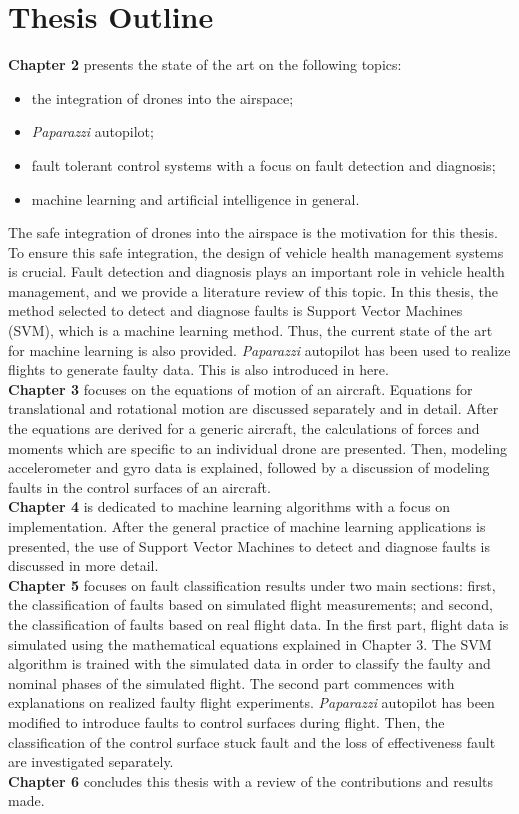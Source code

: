\section{Thesis Outline}

\textbf{Chapter 2} presents the state of the art on the following topics: 
\begin{itemize}
\item{the integration of drones into the airspace;}
\item{\emph{Paparazzi} autopilot;}
\item{fault tolerant control systems with a focus on fault detection and diagnosis;}
\item{machine learning and artificial intelligence in general.}
\end{itemize}
The safe integration of drones into the airspace is the motivation for this thesis. To ensure this safe integration, the design of vehicle health management systems is crucial. Fault detection and diagnosis plays an important role in vehicle health management, and we provide a literature review of this topic. In this thesis, the method selected to detect and diagnose faults is Support Vector Machines (SVM), which is a machine learning method. Thus, the current state of the art for machine learning is also provided. \emph{Paparazzi} autopilot has been used to realize flights to generate faulty data. This is also introduced in here.\\
\textbf{Chapter 3} focuses on the equations of motion of an aircraft. Equations for translational and rotational motion are discussed separately and in detail. After the equations are derived for a generic aircraft, the calculations of forces and moments which are specific to an individual drone are presented. Then, modeling accelerometer and gyro data is explained, followed by a discussion of modeling faults in the control surfaces of an aircraft.\\
\textbf{Chapter 4} is dedicated to machine learning algorithms with a focus on implementation. After the general practice of machine learning applications is presented, the use of Support Vector Machines to detect and diagnose faults is discussed in more detail.\\
\textbf{Chapter 5} focuses on fault classification results under two main sections: first, the classification of faults based on simulated flight measurements; and second, the classification of faults based on real flight data. In the first part, flight data is simulated using the mathematical equations explained in Chapter 3. The SVM algorithm is trained with the simulated data in order to classify the faulty and nominal phases of the simulated flight. The second part commences with explanations on realized faulty flight experiments. \emph{Paparazzi} autopilot has been modified to introduce faults to control surfaces during flight. Then, the classification of the control surface stuck fault and the loss of effectiveness fault are investigated separately.\\
\textbf{Chapter 6} concludes this thesis with a review of the contributions and results made.